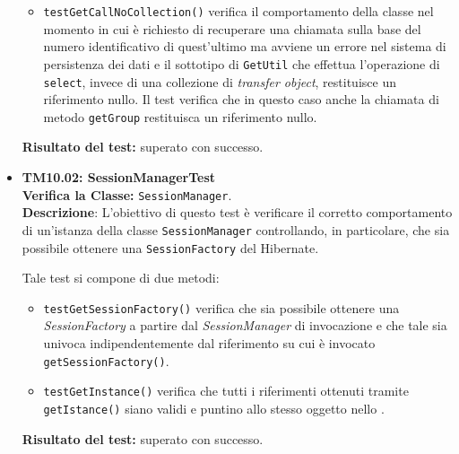 \begin{itemize}
\begin{itemize}
\item \texttt{testGetCallNoCollection()} verifica il comportamento della classe nel momento in cui è richiesto di recuperare una chiamata sulla base del numero identificativo di quest'ultimo ma avviene un errore nel sistema di persistenza dei dati e il sottotipo di \texttt{GetUtil} che effettua l'operazione di \texttt{select}, invece di una collezione di \textit{transfer object}, restituisce un riferimento nullo. Il test verifica che in questo caso anche la chiamata di metodo \texttt{getGroup} restituisca un riferimento nullo.
\end{itemize} 
\textbf{Risultato del test:} superato con successo.

\item[\passed] \textbf{TM10.02: SessionManagerTest}\\
\textbf{Verifica la Classe:} \texttt{SessionManager}.\\
\textbf{Descrizione}: L'obiettivo di questo test è verificare il corretto comportamento di un'istanza della classe \texttt{SessionManager} controllando, in particolare, che sia possibile ottenere una \texttt{SessionFactory} del  Hibernate.

Tale test si compone di due metodi: 
\begin{itemize}
\item \texttt{testGetSessionFactory()} verifica che sia possibile ottenere una \textit{SessionFactory} a partire dal \textit{SessionManager} di invocazione e che tale sia univoca indipendentemente dal riferimento su cui è invocato \texttt{getSessionFactory()}.

\item \texttt{testGetInstance()} verifica che tutti i riferimenti ottenuti tramite \texttt{getIstance()} siano validi e puntino allo stesso oggetto nello .


\end{itemize}
\textbf{Risultato del test:} superato con successo.
\end{itemize}


